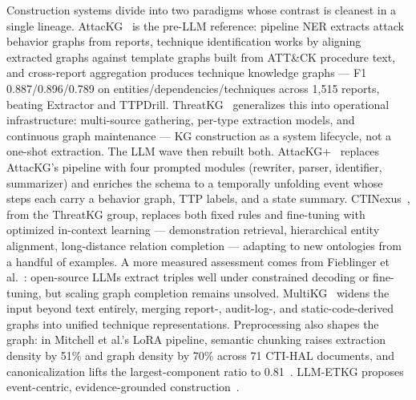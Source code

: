 \documentclass[11pt]{article}
\begin{document}
Construction systems divide into two paradigms whose contrast is cleanest in a single lineage. AttacKG~\citep{li2021attackg} is the pre-LLM reference: pipeline NER extracts attack behavior graphs from reports, technique identification works by aligning extracted graphs against template graphs built from ATT\&CK procedure text, and cross-report aggregation produces technique knowledge graphs — F1 0.887/0.896/0.789 on entities/dependencies/techniques across 1,515 reports, beating Extractor and TTPDrill. ThreatKG~\citep{gao2022threatkg} generalizes this into operational infrastructure: multi-source gathering, per-type extraction models, and continuous graph maintenance — KG construction as a system lifecycle, not a one-shot extraction. The LLM wave then rebuilt both. AttacKG+~\citep{zhang2024attackgboosting} replaces AttacKG's pipeline with four prompted modules (rewriter, parser, identifier, summarizer) and enriches the schema to a temporally unfolding event whose steps each carry a behavior graph, TTP labels, and a state summary. CTINexus~\citep{cheng2024ctinexus}, from the ThreatKG group, replaces both fixed rules and fine-tuning with optimized in-context learning — demonstration retrieval, hierarchical entity alignment, long-distance relation completion — adapting to new ontologies from a handful of examples. A more measured assessment comes from Fieblinger et al.~\citep{fieblinger2024actionable}: open-source LLMs extract triples well under constrained decoding or fine-tuning, but scaling graph completion remains unsolved. MultiKG~\citep{wang2024multikg} widens the input beyond text entirely, merging report-, audit-log-, and static-code-derived graphs into unified technique representations. Preprocessing also shapes the graph: in Mitchell et al.'s LoRA pipeline, semantic chunking raises extraction density by 51\% and graph density by 70\% across 71 CTI-HAL documents, and canonicalization lifts the largest-component ratio to 0.81~\citep{mitchell2026lora}. LLM-ETKG proposes event-centric, evidence-grounded construction~\citep{wang2026llmetkg}.
\end{document}
